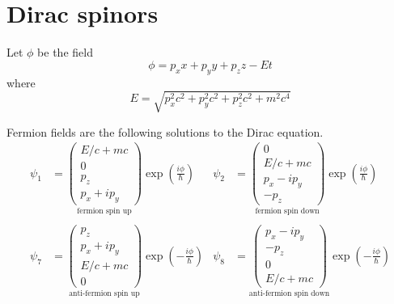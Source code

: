 \documentclass[12pt]{article}
\begin{document}
\section*{Dirac spinors}

Let $\phi$ be the field
\begin{equation*}
\phi=p_xx+p_yy+p_zz-Et
\end{equation*}
where
\begin{equation*}
E=\sqrt{p_x^2c^2+p_y^2c^2+p_z^2c^2+m^2c^4}
\end{equation*}

Fermion fields are the following solutions to the Dirac equation.
\begin{align*}
\psi_1&=\underset{\text{fermion spin up}}{\begin{pmatrix}E/c+mc\\0\\p_z\\p_x+ip_y\end{pmatrix}}
\exp\left(\frac{i\phi}{\hbar}\right)
& \psi_2&=\underset{\text{fermion spin down}}{\begin{pmatrix}0\\E/c+mc\\p_x-ip_y\\-p_z\end{pmatrix}}
\exp\left(\frac{i\phi}{\hbar}\right)
\\
\\
\psi_7&=\underset{\text{anti-fermion spin up}}{\begin{pmatrix}p_z\\p_x+ip_y\\E/c+mc\\0\end{pmatrix}}
\exp\left(-\frac{i\phi}{\hbar}\right)
& \psi_8&=\underset{\text{anti-fermion spin down}}{\begin{pmatrix}p_x-ip_y\\-p_z\\0\\E/c+mc\end{pmatrix}}
\exp\left(-\frac{i\phi}{\hbar}\right)
\end{align*}
\end{document}
